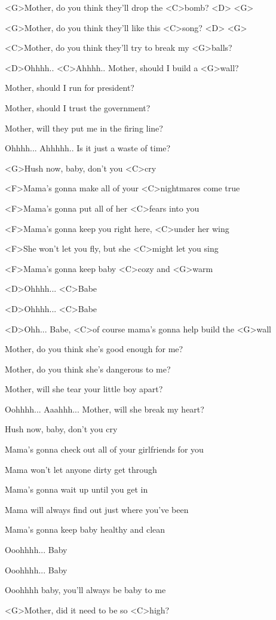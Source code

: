 
\zs
<G>Mother, do you think they'll drop the <C>bomb? <D> <G>

<G>Mother, do you think they'll like this <C>song? <D> <G> 

<C>Mother, do you think they'll try to break my <G>balls?

<D>Ohhhh.. <C>Ahhhh.. Mother, should I build a <G>wall?
\ks

\zs
Mother, should I run for president?

Mother, should I trust the government?

Mother, will they put me in the firing line?

Ohhhh... Ahhhhh.. Is it just a waste of time?
\ks

\zr
<G>Hush now, baby, don't you <C>cry

<F>Mama's gonna make all of your <C>nightmares come true

<F>Mama's gonna put all of her <C>fears into you

<F>Mama's gonna keep you right here, <C>under her wing

<F>She won't let you fly, but she <C>might let you sing

<F>Mama's gonna keep baby <C>cozy and <G>warm

<D>Ohhhh... <C>Babe

<D>Ohhhh... <C>Babe

<D>Ohh... Babe, <C>of course mama's gonna help build the <G>wall
\kr

\zs
Mother, do you think she's good enough for me?

Mother, do you think she's dangerous to me?

Mother, will she tear your little boy apart?

Oohhhh... Aaahhh... Mother, will she break my heart?
\ks

\zr
Hush now, baby, don't you cry

Mama's gonna check out all of your girlfriends for you

Mama won't let anyone dirty get through

Mama's gonna wait up until you get in

Mama will always find out just where you've been

Mama's gonna keep baby healthy and clean

Ooohhhh... Baby

Ooohhhh... Baby

Ooohhhh baby, you'll always be baby to me

<G>Mother, did it need to be so <C>high?
\kr

\kp
